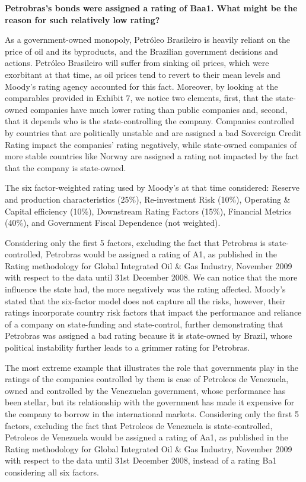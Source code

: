 \documentclass[
]{article}
\begin{document}
\textbf{Petrobras's bonds were assigned a rating of Baa1. What might be
the reason for such relatively low rating?}

As a government-owned monopoly, Petróleo Brasileiro is heavily reliant
on the price of oil and its byproducts, and the Brazilian government
decisions and actions. Petróleo Brasileiro will suffer from sinking oil
prices, which were exorbitant at that time, as oil prices tend to revert
to their mean levels and Moody's rating agency accounted for this fact.
Moreover, by looking at the comparables provided in Exhibit 7, we notice
two elements, first, that the state-owned companies have much lower
rating than public companies and, second, that it depends who is the
state-controlling the company. Companies controlled by countries that
are politically unstable and are assigned a bad Sovereign Credit Rating
impact the companies' rating negatively, while state-owned companies of
more stable countries like Norway are assigned a rating not impacted by
the fact that the company is state-owned.

The six factor-weighted rating used by Moody's at that time considered:
Reserve and production characteristics (25\%), Re-investment Risk
(10\%), Operating \& Capital efficiency (10\%), Downstream Rating
Factors (15\%), Financial Metrics (40\%), and Government Fiscal
Dependence (not weighted).

Considering only the first 5 factors, excluding the fact that Petrobras
is state-controlled, Petrobras would be assigned a rating of A1, as
published in the Rating methodology for Global Integrated Oil \& Gas
Industry, November 2009 with respect to the data until 31st December
2008. We can notice that the more influence the state had, the more
negatively was the rating affected. Moody's stated that the six-factor
model does not capture all the risks, however, their ratings incorporate
country risk factors that impact the performance and reliance of a
company on state-funding and state-control, further demonstrating that
Petrobras was assigned a bad rating because it is state-owned by Brazil,
whose political instability further leads to a grimmer rating for
Petrobras.

The most extreme example that illustrates the role that governments play
in the ratings of the companies controlled by them is case of Petroleos
de Venezuela, owned and controlled by the Venezuelan government, whose
performance has been stellar, but its relationship with the government
has made it expensive for the company to borrow in the international
markets. Considering only the first 5 factors, excluding the fact that
Petroleos de Venezuela is state-controlled, Petroleos de Venezuela would
be assigned a rating of Aa1, as published in the Rating methodology for
Global Integrated Oil \& Gas Industry, November 2009 with respect to the
data until 31st December 2008, instead of a rating Ba1 considering all
six factors.
\end{document}
